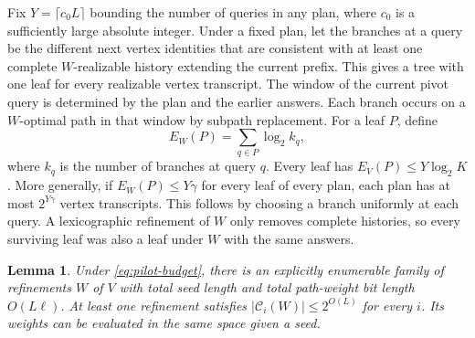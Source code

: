 \documentclass[11pt]{article}
\newtheorem{lemma}[theorem]{Lemma}
\newcommand{\calC}{\mathcal C}
\begin{document}
Fix $Y=\lceil c_0L\rceil$ bounding the number of queries in any plan,
where $c_0$ is a sufficiently large absolute integer.
Under a fixed plan, let the branches at a query be the different next
vertex identities that are consistent with at least one complete
$W$-realizable history extending the current prefix. This gives a tree
with one leaf for every realizable vertex transcript. The window of the
current pivot query is determined by the plan and the earlier answers.
Each branch occurs on a $W$-optimal path in that window by subpath
replacement. For a leaf $P$, define
\[
        E_W(P)=\sum_{q\in P}\log_2 k_q,
\]
where $k_q$ is the number of branches at query $q$. Every leaf has
$E_V(P)\le Y\log_2 K$. More generally, if $E_W(P)\le Y\gamma$ for
every leaf of every plan, each plan has at most $2^{Y\gamma}$ vertex
transcripts. This follows by choosing a branch uniformly at each query.
A lexicographic refinement of $W$ only removes complete histories, so every
surviving leaf was also a leaf under $W$ with the same answers.

\begin{lemma}\label{lem:iter-pilot}
Under \eqref{eq:pilot-budget}, there is an explicitly enumerable family
of refinements $W$ of $V$ with total seed length and total path-weight
bit length $O(L\ell)$. At least one refinement satisfies
$|\calC_i(W)|\le 2^{O(L)}$ for every $i$. Its weights can be evaluated
in the same space given a seed.
\end{lemma}
\end{document}
